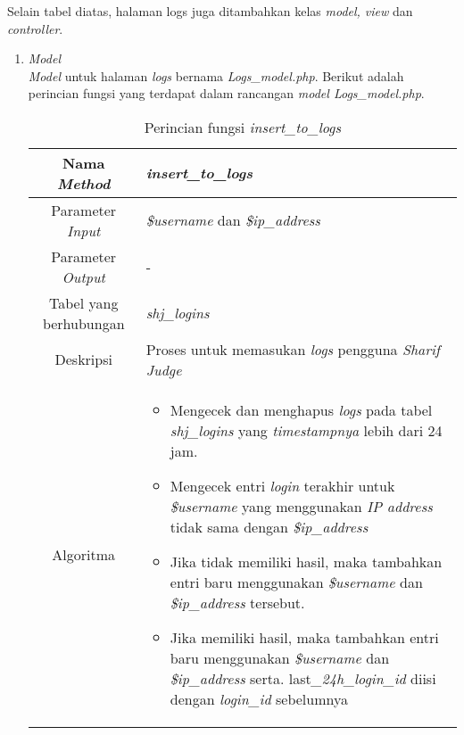 Selain tabel diatas, halaman logs juga ditambahkan kelas \textit{model, view} dan \textit{controller}.
\begin{enumerate}
	\item \textit{Model} \\
	\textit{Model} untuk halaman \textit{logs} bernama \textit{Logs\_model.php}. Berikut adalah perincian fungsi yang terdapat dalam rancangan \textit{model Logs\_model.php}.
	\begin{table}[H]
		\caption{Perincian fungsi \textit{insert\_to\_logs}}
		\begin{tabular}{|c|p{11cm}|}
			\hline
			Nama \textit{Method} 	& 	\textit{insert\_to\_logs} 	\\
			\hline
			Parameter \textit{Input} & \textit{\$username} dan \textit{\$ip\_address} \\
			\hline
			Parameter \textit{Output} & -\\
			\hline
			Tabel yang berhubungan & \textit{shj\_logins} \\
			\hline
			Deskripsi	& Proses untuk memasukan \textit{logs} pengguna \textit{Sharif Judge} \\
			\hline
			Algoritma	& \begin{itemize}
				\item Mengecek dan menghapus \textit{logs} pada tabel \textit{shj\_logins} yang \textit{timestampnya} lebih dari 24 jam.
				\item Mengecek entri \textit{login} terakhir untuk \textit{\$username} yang  menggunakan \textit{IP address} tidak sama dengan \textit{\$ip\_address}
				\item Jika tidak memiliki hasil, maka tambahkan entri baru menggunakan \textit{\$username} dan \textit{\$ip\_address} tersebut.
				\item Jika memiliki hasil,  maka tambahkan entri baru menggunakan \textit{\$username} dan \textit{\$ip\_address} serta. last\textit{\_24h\_login\_id} diisi dengan \textit{login\_id} sebelumnya
			\end{itemize} \\
			\hline
		\end{tabular}
	\end{table}


\end{enumerate}
